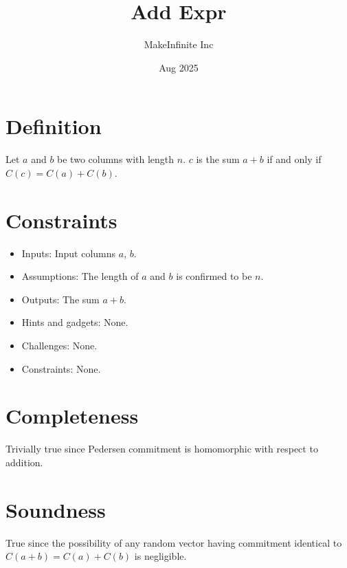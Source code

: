 \documentclass[11pt]{article}
\title{Add Expr}
\author{MakeInfinite Inc}
\date{Aug 2025}
\begin{document}
\maketitle

\section{Definition}
\noindent Let $a$ and $b$ be two columns with length $n$. $c$ is the sum $a + b$ if and only if $C(c) = C(a) + C(b)$.
\section{Constraints}
\begin{itemize}
    \item Inputs: Input columns $a$, $b$.
    \item Assumptions: The length of $a$ and $b$ is confirmed to be $n$.
    \item Outputs: The sum $a + b$.
    \item Hints and gadgets: None.
    \item Challenges: None.
    \item Constraints: None.
\end{itemize}
\section{Completeness}
Trivially true since Pedersen commitment is homomorphic with respect to addition.
\section{Soundness}
True since the possibility of any random vector having commitment identical to $C(a+b) = C(a) + C(b)$ is negligible.
\end{document}
